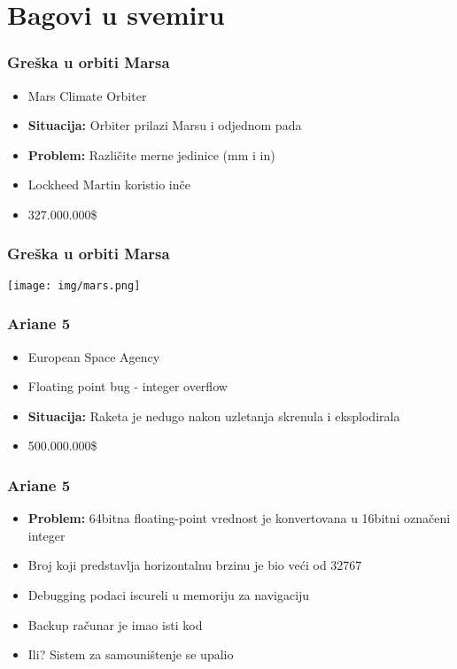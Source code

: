 \documentclass{beamer}
\begin{document}
\section*{Bagovi u svemiru}
\begin{frame}
    \frametitle{Greška u orbiti Marsa}
    \begin{itemize}
        \item Mars Climate Orbiter \newline
        \item \textbf{Situacija:} Orbiter prilazi Marsu i odjednom pada \newline
        \item \textbf{Problem: } Različite merne jedinice (mm i in) \newline
        \item Lockheed Martin koristio inče \newline
        \item 327.000.000\$
    \end{itemize}
\end{frame}

\begin{frame}
    \frametitle{Greška u orbiti Marsa}
    \begin{center}
        \texttt{[image: img/mars.png]}
    \end{center}
\end{frame}

\begin{frame}
    \frametitle{Ariane 5}
    \begin{itemize}
        \item European Space Agency \newline
        \item Floating point bug - integer overflow \newline
        \item \textbf{Situacija:} Raketa je nedugo nakon uzletanja skrenula i eksplodirala \newline
        \item 500.000.000\$
    \end{itemize}
\end{frame}

\begin{frame}
    \frametitle{Ariane  5}
    \begin{itemize}
        \item \textbf{Problem:} 64bitna floating-point vrednost je konvertovana u 16bitni označeni integer \newline
        \item Broj koji predstavlja horizontalnu brzinu je bio veći od 32767 \newline
        \item Debugging podaci iscureli u memoriju za navigaciju \newline
        \item Backup računar je imao isti kod \newline
        \item Ili? Sistem za samouništenje se upalio
    \end{itemize}
\end{frame}
\end{document}
